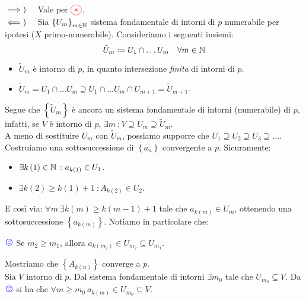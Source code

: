 \begin{demonstration}
	$\implies)\quad$ Vale per $\textcolor{red}{\circled{\ast}}$.\\
	$\impliedby)\quad$ Sia $\left\{U_m\right\}_{m\in\mathbb{N}}$ sistema fondamentale di intorni di $p$ numerabile per ipotesi ($X$ primo-numerabile). Consideriamo i seguenti insiemi:
	\begin{equation*}
	\tilde{U}_m\coloneqq U_1\cap\ldots U_m\quad \forall m\in \mathbb{N}
	\end{equation*}
\begin{itemize}
	\item $\tilde{U}_m$ è intorno di $p$, in quanto intersezione \textit{finita} di intorni di $p$.
	\item $\tilde{U}_m=U_1\cap\ldots U_m\supseteq U_1\cap\ldots U_m\cap U_{m+1}=\tilde{U}_{m+1}$.
\end{itemize}
Segue che $\left\{\tilde{U}_m\right\}$ è ancora un sistema fondamentale di intorni (numerabile) di $p$, infatti, se $V$ è intorno di $p$, $\exists m\ \colon V\supseteq U_m\supseteq \tilde{U}_m$.\\
A meno di sostituire $U_m$ con $\tilde{U}_m$, possiamo supporre che $U_1\supseteq U_2\supseteq U_3\supseteq \ldots$.\\
Costruiamo una sottosuccessione di $\left\{a_n\right\}$ convergente a $p$. Sicuramente:
\begin{itemize}
	\item $\exists k\left(1\right)\in \mathbb{N}\ \colon a_{k\left(1\right)}\in U_1$.
	\item $\exists k\left(2\right)\geq k\left(1\right)+1\ \colon A_{k\left(2\right)}\in U_2$.
\end{itemize}
E così via: $\forall m\ \exists k\left(m\right)\geq k\left(m-1\right)+1$ tale che $a_{k\left(m\right)}\in U_m$, ottenendo una sottosuccessione $\left\{a_{k\left(m\right)}\right\}$. Notiamo in particolare che:
\begin{center}
\label{notasorridente} $\textcolor{blue}{{\large \smiley{}}}$ Se $m_2\geq m_1$, allora $a_{k\left(m_2\right)}\in U_{m_2}\subseteq U_{m_1}$.
\end{center}
Mostriamo che $\left\{A_{k\left(n\right)}\right\}$ converge a $p$.\\
Sia $V$ intorno di $p$. Dal sistema fondamentale di intorni $\exists m_0$ tale che $U_{m_0}\subseteq V$. Da $\textcolor{blue}{{\large \smiley{}}}$ si ha che $\forall m\geq m_0\ a_{k\left(m\right)}\in U_{m_0}\subseteq V$.
\end{demonstration}
